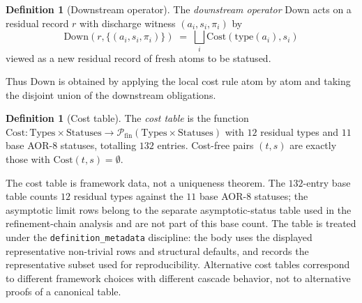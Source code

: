 \documentclass[11pt]{article}
\theoremstyle{definition}
\newtheorem{definition}[theorem]{Definition}
\begin{document}
\begin{definition}[Downstream operator]\label{def:aor:down-operator}
The \emph{downstream operator} $\mathrm{Down}$ acts on a residual
record $r$ with discharge witness $(a_i,s_i,\pi_i)$ by
\[
  \mathrm{Down}(r,\{(a_i,s_i,\pi_i)\})
  \;=\;
  \bigsqcup_i \mathrm{Cost}(\mathrm{type}(a_i),s_i)
\]
viewed as a new residual record of fresh atoms to be statused.
\end{definition}

Thus \(\mathrm{Down}\) is obtained by applying the local cost rule atom by atom and
taking the disjoint union of the downstream obligations.

\begin{definition}[Cost table]\label{def:aor:cost-table}
The \emph{cost table} is the function
$\mathrm{Cost}:\mathrm{Types}\times\mathrm{Statuses}\to
\mathcal P_{\mathrm{fin}}(\mathrm{Types}\times\mathrm{Statuses})$
with $12$ residual types and $11$ base AOR-8 statuses, totalling $132$
entries.  Cost-free pairs $(t,s)$ are exactly those with
$\mathrm{Cost}(t,s)=\emptyset$.
\end{definition}

The cost table is framework data, not a uniqueness theorem.  The
\(132\)-entry base table counts \(12\) residual types against the
\(11\) base AOR-8 statuses; the asymptotic limit rows belong to the
separate asymptotic-status table used in the refinement-chain
analysis and are not part of this base count.  The table is treated
under the \texttt{definition\_metadata} discipline: the body uses the
displayed representative non-trivial rows and structural defaults, and
 records the representative
subset used for reproducibility.  Alternative cost tables correspond
to different framework choices with different cascade behavior, not to
alternative proofs of a canonical table.
\end{document}

